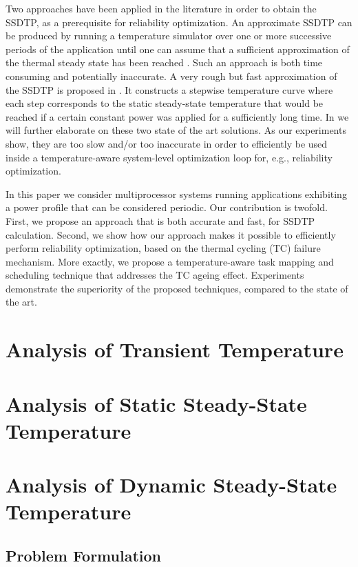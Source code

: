 Two approaches have been applied in the literature in order to obtain the SSDTP,
as a prerequisite for reliability optimization. An approximate SSDTP can be
produced by running a temperature simulator over one or more successive periods
of the application until one can assume that a sufficient approximation of the
thermal steady state has been reached \cite{srinivasan2004}. Such an approach is
both time consuming and potentially inaccurate. A very rough but fast
approximation of the SSDTP is proposed in \cite{huang2009}. It constructs a
stepwise temperature curve where each step corresponds to the static
steady-state temperature that would be reached if a certain constant power was
applied for a sufficiently long time. In  we will further
elaborate on these two state of the art solutions. As our experiments show, they
are too slow and/or too inaccurate in order to efficiently be used inside a
temperature-aware system-level optimization loop for, e.g., reliability
optimization.

In this paper we consider multiprocessor systems running applications exhibiting
a power profile that can be considered periodic. Our contribution is twofold.
First, we propose an approach that is both accurate and fast, for SSDTP
calculation. Second, we show how our approach makes it possible to efficiently
perform reliability optimization, based on the thermal cycling (TC) failure
mechanism. More exactly, we propose a temperature-aware task mapping and
scheduling technique that addresses the TC ageing effect. Experiments
demonstrate the superiority of the proposed techniques, compared to the state of
the art.

\section{Analysis of Transient Temperature} 

\section{Analysis of Static Steady-State Temperature}

\section{Analysis of Dynamic Steady-State Temperature}

\subsection{Problem Formulation}

